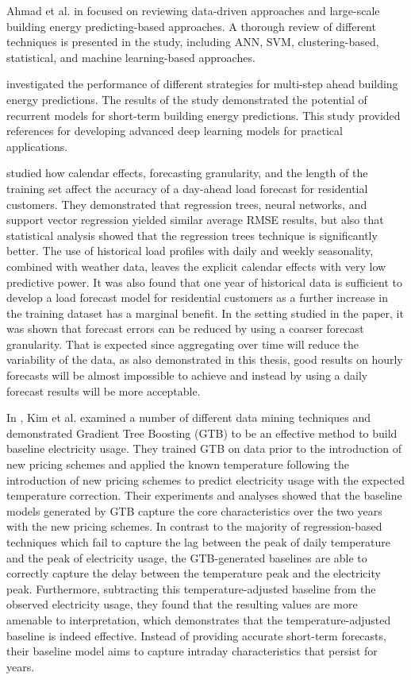 Ahmad et al. in \cite{AHMAD2018301} focused on reviewing data-driven approaches and large-scale building energy predicting-based approaches.
A thorough review of different techniques is presented in the study, including ANN, SVM, clustering-based, statistical, and machine learning-based approaches.

\cite{FAN2019700} investigated the performance of different strategies for multi-step ahead building energy predictions.
The results of the study demonstrated the potential of recurrent models for short-term building energy predictions.
This study provided references for developing advanced deep learning models for practical applications.

\cite{LUSIS2017654} studied how calendar effects, forecasting granularity, and the length of the training set affect the accuracy of a day-ahead load forecast for residential customers.
They demonstrated that regression trees, neural networks, and support vector regression yielded similar average RMSE results, but also that statistical analysis showed that the regression trees technique is significantly better.
The use of historical load profiles with daily and weekly seasonality, combined with weather data, leaves the explicit calendar effects with very low predictive power.
It was also found that one year of historical data is sufficient to develop a load forecast model for residential customers as a further increase in the training dataset has a marginal benefit.
In the setting studied in the paper, it was shown that forecast errors can be reduced by using a coarser forecast granularity.
That is expected since aggregating over time will reduce the variability of the data, as also demonstrated in this thesis, good results on hourly forecasts will be almost impossible to achieve and instead by using a daily forecast results will be more acceptable.

In \cite{7463810}, Kim et al. examined a number of different data mining techniques and demonstrated Gradient Tree Boosting (GTB) to be an effective method to build baseline electricity usage.
They trained GTB on data prior to the introduction of new pricing schemes and applied the known temperature following the introduction of new pricing schemes to predict electricity usage with the expected temperature correction.
Their experiments and analyses showed that the baseline models generated by GTB capture the core characteristics over the two years with the new pricing schemes.
In contrast to the majority of regression-based techniques which fail to capture the lag between the peak of daily temperature and the peak of electricity usage, the GTB-generated baselines are able to correctly capture the delay between the temperature peak and the electricity peak.
Furthermore, subtracting this temperature-adjusted baseline from the observed electricity usage, they found that the resulting values are more amenable to interpretation, which demonstrates that the temperature-adjusted baseline is indeed effective.
Instead of providing accurate short-term forecasts, their baseline model aims to capture intraday characteristics that persist for years.

